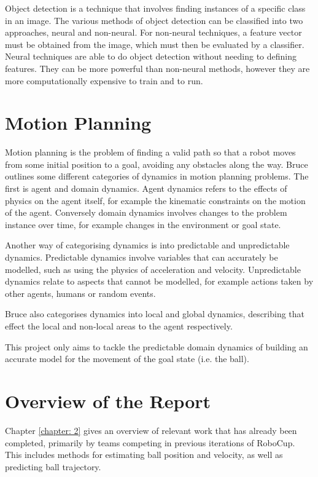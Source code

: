 Object detection is a technique that involves finding instances of a specific class in an image. The various methods of object detection can be classified into two approaches, neural and non-neural. For non-neural techniques, a feature vector must be obtained from the image, which must then be evaluated by a classifier. Neural techniques are able to do object detection without needing to defining features. They can be more powerful than non-neural methods, however they are more computationally expensive to train and to run.

\section{Motion Planning}

Motion planning is the problem of finding a valid path so that a robot moves from some initial position to a goal, avoiding any obstacles along the way. Bruce\cite{Bruce2006} outlines some different categories of dynamics in motion planning problems. The first is agent and domain dynamics. Agent dynamics refers to the effects of physics on the agent itself, for example the kinematic constraints on the motion of the agent. Conversely domain dynamics involves changes to the problem instance over time, for example changes in the environment or goal state.

Another way of categorising dynamics is into predictable and unpredictable dynamics. Predictable dynamics involve variables that can accurately be modelled, such as using the physics of acceleration and velocity. Unpredictable dynamics relate to aspects that cannot be modelled, for example actions taken by other agents, humans or random events.

Bruce also categorises dynamics into local and global dynamics, describing that effect the local and non-local areas to the agent respectively.

This project only aims to tackle the predictable domain dynamics of building an accurate model for the movement of the goal state (i.e. the ball).

\section{Overview of the Report}

Chapter \ref{chapter: 2} gives an overview of relevant work that has already been completed, primarily by teams competing in previous iterations of RoboCup. This includes methods for estimating ball position and velocity, as well as predicting ball trajectory. 

